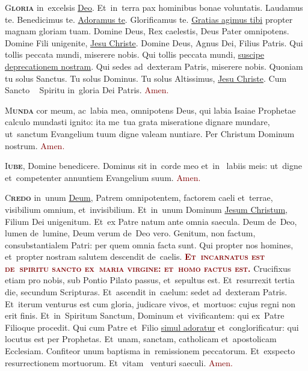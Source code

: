 \documentclass[12pt, landscape]{scrartcl}
\newcommand{\cross}{\textcolor{red}{\raisebox{-1mm}{\scalebox{1.5}{\ding{64}}}}}
\newcommand{\amen}{\textcolor{Maroon}{Amen.}}
\newcommand{\initial}[2]{\lettrine[lines=3]{\color{Maroon}#1}{\bfseries\color{Maroon}#2}}
\newcommand{\gap}{\vspace{0.65cm}}
\newcommand{\bend}[1]{\ul{#1}}
\begin{document}
\thispagestyle{empty}

\pagecolor{fondpaille}
\color{darkgreen}
\large

\begin{center}

    \begin{minipage}[t]{0.29\linewidth}

        \vspace*{2.2cm}

        \initial{G}{loria} in~excelsis \bend{Deo}. Et~in~terra pax hominibus
        bonae voluntatis. Laudamus te. Benedicimus te. \bend{Adoramus te}.
        Glorificamus te. \bend{Gratias agimus tibi} propter magnam gloriam
        tuam. Domine Deus, Rex caelestis, Deus Pater omnipotens. Domine Fili
        unigenite, \bend{Jesu Christe}. Domine Deus, Agnus Dei, Filius Patris.
        Qui tollis peccata mundi, miserere nobis. Qui tollis peccata mundi,
        \bend{suscipe deprecationem nostram}. Qui sedes ad~dexteram Patris,
        miserere nobis. Quoniam tu solus Sanctus. Tu solus Dominus. Tu solus
        Altissimus, \bend{Jesu Christe}. Cum Sancto \cross~ Spiritu in~gloria
        Dei Patris. \amen

        \gap

        \initial{M}{unda} cor meum, ac~labia mea, omnipotens Deus, qui labia
        Isaiae Prophetae calculo mundasti ignito: ita me~tua grata miseratione
        dignare mundare, ut~sanctum Evangelium tuum digne valeam nuntiare. Per
        Christum Dominum nostrum. \amen

        \gap

        \initial{I}{ube}, Domine benedicere. Dominus sit in~corde meo et~in~
        labiis meis: ut~digne et~competenter annuntiem Evangelium suum. \amen

        \gap

        \initial{C}{redo} in~unum \bend{Deum}, Patrem omnipotentem, factorem
        caeli et~terrae, visibilium omnium, et~invisibilium. Et~in~unum Dominum
        \bend{Jesum Christum}, Filium Dei unigenitum. Et~ex Patre natum ante
        omnia saecula. Deum de~Deo, lumen de~lumine, Deum verum de~Deo vero.
        Genitum, non factum, consubstantialem Patri: per quem omnia facta sunt.
        Qui propter nos homines, et~propter nostram salutem descendit de~caelis.
        \textcolor{Maroon}{\bfseries\scshape Et~incarnatus est de~spiritu sancto
        ex~maria virgine: et~homo factus est.} Crucifixus etiam pro nobis, sub
        Pontio Pilato passus, et~sepultus est. Et~resurrexit tertia die,
        secundum Scripturas. Et~ascendit in~caelum: sedet ad~dexteram Patris.
        Et~iterum venturus est cum gloria, judicare vivos, et~mortuos: cujus
        regni non erit finis. Et~in~Spiritum Sanctum, Dominum et~vivificantem:
        qui ex~Patre Filioque procedit. Qui cum Patre et~Filio \bend{simul
        adoratur} et~conglorificatur: qui locutus est per Prophetas. Et~unam,
        sanctam, catholicam et~apostolicam Ecclesiam. Confiteor unum baptisma
        in~remissionem peccatorum. Et~exspecto resurrectionem mortuorum.
        Et~vitam \cross~venturi saeculi.
        \amen


\end{minipage}
\end{center}
\end{document}
